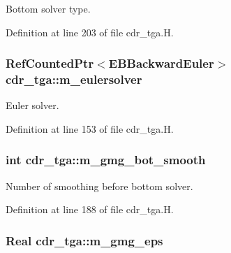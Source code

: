 Bottom solver type. 



Definition at line 203 of file cdr\+\_\+tga.\+H.

\subsubsection[{\texorpdfstring{m\+\_\+eulersolver}{m_eulersolver}}]{\setlength{\rightskip}{0pt plus 5cm}Ref\+Counted\+Ptr$<$E\+B\+Backward\+Euler$>$ cdr\+\_\+tga\+::m\+\_\+eulersolver\hspace{0.3cm}{\ttfamily [protected]}}\hypertarget{classcdr__tga_a333fc9ca388b6b94defca87c7e2ed065}{}\label{classcdr__tga_a333fc9ca388b6b94defca87c7e2ed065}


Euler solver. 



Definition at line 153 of file cdr\+\_\+tga.\+H.

\subsubsection[{\texorpdfstring{m\+\_\+gmg\+\_\+bot\+\_\+smooth}{m_gmg_bot_smooth}}]{\setlength{\rightskip}{0pt plus 5cm}int cdr\+\_\+tga\+::m\+\_\+gmg\+\_\+bot\+\_\+smooth\hspace{0.3cm}{\ttfamily [protected]}}\hypertarget{classcdr__tga_a87b2508abfb3b2a694401556220bd5ca}{}\label{classcdr__tga_a87b2508abfb3b2a694401556220bd5ca}


Number of smoothing before bottom solver. 



Definition at line 188 of file cdr\+\_\+tga.\+H.

\subsubsection[{\texorpdfstring{m\+\_\+gmg\+\_\+eps}{m_gmg_eps}}]{\setlength{\rightskip}{0pt plus 5cm}Real cdr\+\_\+tga\+::m\+\_\+gmg\+\_\+eps\hspace{0.3cm}{\ttfamily [protected]}}\hypertarget{classcdr__tga_a432de2e218262dcf0b29ec67079aeae2}{}\label{classcdr__tga_a432de2e218262dcf0b29ec67079aeae2}


